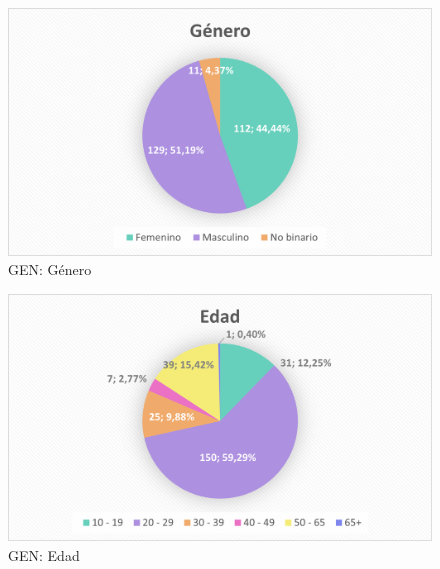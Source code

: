 \documentclass[12pt, a4paper,twoside,titlepage]{book}
\begin{document}
\begin{figure}
	\centering
	\includegraphics[width=.8\linewidth]{ANEXO Gen/1AnexGENGen}
	\caption{GEN: Género}
	\label{fig:GENGenero}
\end{figure}


\begin{figure}
	\centering
	\includegraphics[width=.8\linewidth]{ANEXO Gen/2AnexGENEdad}
	\caption{GEN: Edad}
	\label{fig:GENEdad}
\end{figure}
\end{document}
